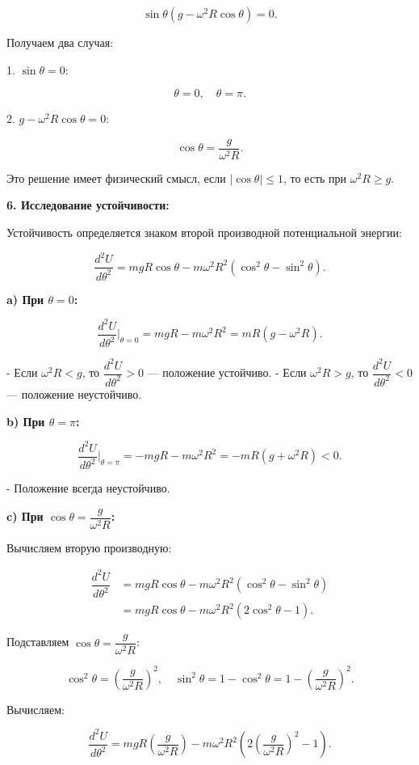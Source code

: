\documentclass{article}
\begin{document}
\[
\sin \theta \left( g - \omega^2 R \cos \theta \right) = 0.
\]

Получаем два случая:

1. \(\sin \theta = 0\):

\[
\theta = 0, \quad \theta = \pi.
\]

2. \(g - \omega^2 R \cos \theta = 0\):

\[
\cos \theta = \dfrac{g}{\omega^2 R}.
\]

Это решение имеет физический смысл, если \(|\cos \theta| \leq 1\), то есть при \(\omega^2 R \geq g\).

\textbf{6. Исследование устойчивости:}

Устойчивость определяется знаком второй производной потенциальной энергии:

\[
\dfrac{d^2 U}{d\theta^2} = mgR \cos \theta - m \omega^2 R^2 (\cos^2 \theta - \sin^2 \theta).
\]

\textbf{a) При \(\theta = 0\):}

\[
\dfrac{d^2 U}{d\theta^2} \bigg|_{\theta = 0} = mgR - m \omega^2 R^2 = mR (g - \omega^2 R).
\]

- Если \(\omega^2 R < g\), то \(\dfrac{d^2 U}{d\theta^2} > 0\) — положение устойчиво.
- Если \(\omega^2 R > g\), то \(\dfrac{d^2 U}{d\theta^2} < 0\) — положение неустойчиво.

\textbf{b) При \(\theta = \pi\):}

\[
\dfrac{d^2 U}{d\theta^2} \bigg|_{\theta = \pi} = -mgR - m \omega^2 R^2 = -mR (g + \omega^2 R) < 0.
\]

- Положение всегда неустойчиво.

\textbf{c) При \(\cos \theta = \dfrac{g}{\omega^2 R}\):}

Вычисляем вторую производную:

\[
\begin{aligned}
\dfrac{d^2 U}{d\theta^2} &= mgR \cos \theta - m \omega^2 R^2 (\cos^2 \theta - \sin^2 \theta) \\
&= mgR \cos \theta - m \omega^2 R^2 (2 \cos^2 \theta - 1).
\end{aligned}
\]

Подставляем \(\cos \theta = \dfrac{g}{\omega^2 R}\):

\[
\cos^2 \theta = \left( \dfrac{g}{\omega^2 R} \right)^2, \quad \sin^2 \theta = 1 - \cos^2 \theta = 1 - \left( \dfrac{g}{\omega^2 R} \right)^2.
\]

Вычисляем:

\[
\dfrac{d^2 U}{d\theta^2} = mgR \left( \dfrac{g}{\omega^2 R} \right ) - m \omega^2 R^2 \left( 2 \left( \dfrac{g}{\omega^2 R} \right )^2 - 1 \right ).
\]
\end{document}

